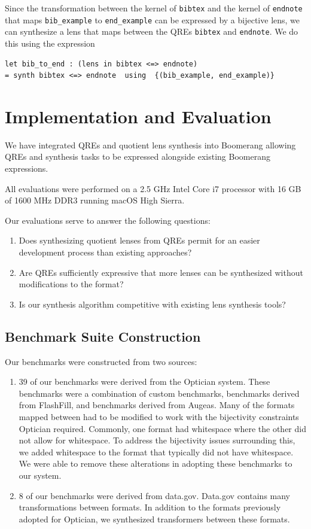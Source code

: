 \documentclass[acmsmall,review,anonymous]{acmart}
\newcommand{\cd}[1]{\lstinline[backgroundcolor=\color{white}]$#1$}
\begin{document}
Since the transformation between the kernel of \cd{bibtex} and the kernel of
\cd{endnote} that maps \cd{bib_example} to \cd{end_example} can be
expressed by a bijective lens, we can synthesize a lens that maps between the
QREs \cd{bibtex} and \cd{endnote}. We do this using the expression

\begin{lstlisting}
let bib_to_end : (lens in bibtex <=> endnote)
= synth bibtex <=> endnote  using  {(bib_example, end_example)}
\end{lstlisting}

\section{Implementation and Evaluation}
\label{impl}


We have integrated QREs and quotient lens synthesis into Boomerang allowing QREs
and synthesis tasks to be expressed alongside existing Boomerang expressions.

All evaluations were performed on a 2.5 GHz Intel Core i7 processor with 16 GB
of 1600 MHz DDR3 running macOS High Sierra.

Our evaluations serve to answer the following questions:
\begin{enumerate}
  \item Does synthesizing quotient lenses from QREs permit for an easier
  development process than existing approaches?
  
  \item Are QREs sufficiently expressive that more lenses can be synthesized
  without modifications to the format?
  
  \item Is our synthesis algorithm competitive with existing lens synthesis
  tools?
\end{enumerate}

\subsection{Benchmark Suite Construction}
Our benchmarks were constructed from two sources:
\begin{enumerate}
  \item 39 of our benchmarks were derived from the Optician system.  These
  benchmarks were a combination of custom benchmarks, benchmarks derived from
  FlashFill, and benchmarks derived from Augeas.  Many of the formats mapped
  between had to be modified to work with the bijectivity constraints
  Optician required.  Commonly, one format had whitespace where the other did
  not allow for whitespace.  To address the bijectivity issues surrounding this,
  we added whitespace to the format that typically did not have whitespace.  We
  were able to remove these alterations in adopting these benchmarks to our
  system.
  
  \item 8 of our benchmarks were derived from data.gov.  Data.gov contains
  many transformations between formats.  In addition to the formats previously
  adopted for Optician, we synthesized transformers between these formats.
\end{enumerate}
\end{document}
